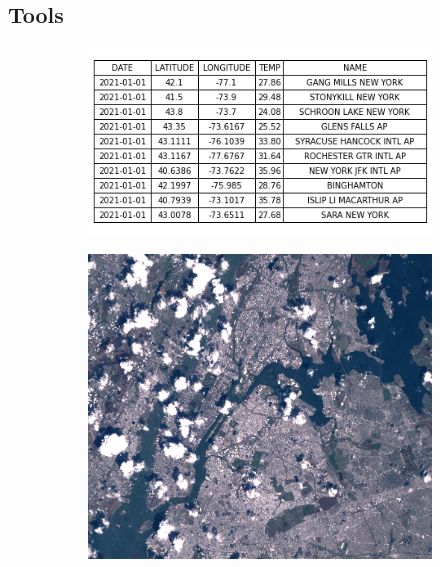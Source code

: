 \documentclass[../main.tex]{subfiles}
\begin{document}
\subsection{Tools}
\label{sec:intro:data:tools}
\begin{figure}[H]
    \begin{subfigure}{.3\textwidth}
        \includegraphics[width=1\textwidth]{figures/intro/table.png}
        \caption{}
        \label{fig:intro:table}
    \end{subfigure}
    \begin{subfigure}{.3\textwidth}
        \includegraphics[width=1\textwidth]{figures/intro/landsat.png}
        \caption{}
        \label{fig:intro:image}
    \end{subfigure}
    \begin{subfigure}{.3\textwidth}

\end{subfigure}
\end{figure}
\end{document}
